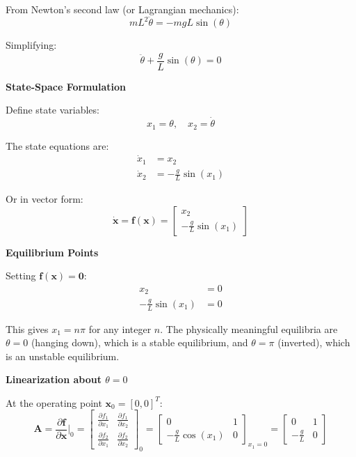 From Newton's second law (or Lagrangian mechanics):
\begin{equation}
mL^2\ddot{\theta} = -mgL\sin(\theta)
\end{equation}

Simplifying:
\begin{equation}
\ddot{\theta} + \frac{g}{L}\sin(\theta) = 0
\label{eq:pendulum_nonlinear}
\end{equation}

\textbf{State-Space Formulation}

Define state variables:
\begin{equation}
x_1 = \theta, \quad x_2 = \dot{\theta}
\end{equation}

The state equations are:
\begin{align}
\dot{x}_1 &= x_2 \\
\dot{x}_2 &= -\frac{g}{L}\sin(x_1)
\end{align}

Or in vector form:
\begin{equation}
\dot{\mathbf{x}} = \mathbf{f}(\mathbf{x}) = \begin{bmatrix} x_2 \\ -\frac{g}{L}\sin(x_1) \end{bmatrix}
\end{equation}

\textbf{Equilibrium Points}

Setting $\mathbf{f}(\mathbf{x}) = \mathbf{0}$:
\begin{align}
x_2 &= 0 \\
-\frac{g}{L}\sin(x_1) &= 0
\end{align}

This gives $x_1 = n\pi$ for any integer $n$. The physically meaningful equilibria are $\theta = 0$ (hanging down), which is a stable equilibrium, and $\theta = \pi$ (inverted), which is an unstable equilibrium.

\textbf{Linearization about $\theta = 0$}

At the operating point $\mathbf{x}_0 = [0, 0]^T$:
\begin{equation}
\mathbf{A} = \frac{\partial \mathbf{f}}{\partial \mathbf{x}}\bigg|_0 = \begin{bmatrix} \frac{\partial f_1}{\partial x_1} & \frac{\partial f_1}{\partial x_2} \\ \frac{\partial f_2}{\partial x_1} & \frac{\partial f_2}{\partial x_2} \end{bmatrix}_0 = \begin{bmatrix} 0 & 1 \\ -\frac{g}{L}\cos(x_1) & 0 \end{bmatrix}_{x_1=0} = \begin{bmatrix} 0 & 1 \\ -\frac{g}{L} & 0 \end{bmatrix}
\end{equation}

